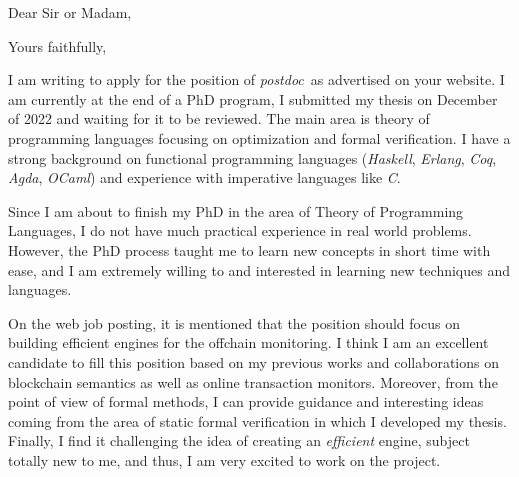 \documentclass[11pt,a4paper,sans]{moderncv}   %
\newcommand\position{\emph{postdoc}}
\begin{document}
\opening{Dear Sir or Madam,}
\closing{Yours faithfully,}
\makelettertitle

I am writing to apply for the position of \position\, as advertised on your
website.
%
I am currently at the end of a PhD program, I submitted my thesis on December of
2022 and waiting for it to be reviewed.
%
The main area is theory of programming languages focusing on optimization and
formal verification.
%
I have a strong background on functional programming languages (\emph{Haskell},
\emph{Erlang}, \emph{Coq}, \emph{Agda}, \emph{OCaml}) and experience with
imperative languages like \emph{C}.


Since I am about to finish my PhD in the area of Theory of Programming
Languages, I do not have much practical experience in real world problems.
%
However, the PhD process taught me to learn new concepts in short
time with ease, and I am extremely willing to and interested in
learning new techniques and languages.

On the web job posting, it is mentioned that the position should focus on
building efficient engines for the offchain monitoring.
%
I think I am an excellent candidate to fill this position based on my previous
works and collaborations on blockchain semantics as well as online transaction
monitors.
%
Moreover, from the point of view of formal methods, I can provide guidance and
interesting ideas coming from the area of static formal verification in which I
developed my thesis.
%
Finally, I find it challenging the idea of creating an \emph{efficient} engine,
subject totally new to me, and thus, I am very excited to work on the project.

%
\end{document}
